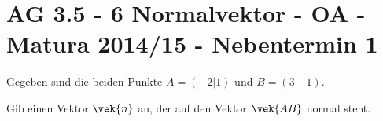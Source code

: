 \section{AG 3.5 - 6 Normalvektor - OA - Matura 2014/15 - Nebentermin 1}

\begin{beispiel}[AG 3.5]{1} %
Gegeben sind die beiden Punkte $A=(-2|1)$ und $B=(3|-1)$. \leer

Gib einen Vektor $\vek{n}$ an, der auf den Vektor $\vek{AB}$ normal steht. 

\end{beispiel}